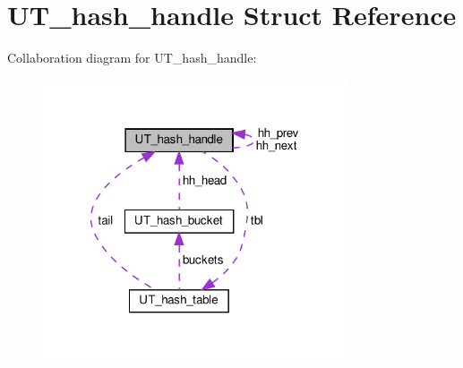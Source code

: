 \hypertarget{structUT__hash__handle}{}\section{U\+T\+\_\+hash\+\_\+handle Struct Reference}
\label{structUT__hash__handle}


Collaboration diagram for U\+T\+\_\+hash\+\_\+handle\+:
\nopagebreak
\begin{figure}[H]
\begin{center}
\leavevmode
\includegraphics[width=255pt]{structUT__hash__handle__coll__graph}
\end{center}
\end{figure}
